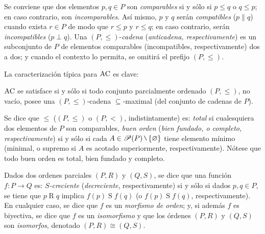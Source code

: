 Se conviene que dos elementos $p,q \in P$ son \textit{comparables} si y sólo si $p \leq q$ o $q \leq p$; en caso contrario, son \textit{incomparables}. Así mismo, $p$ y $q$ serán \textit{compatibles} ($p \parallel q$) cuando exista $r \in P$ de modo que $r \leq p$ y $r \leq q$; en caso contrario, serán \textit{incompatibles} ($p \perp q$). Una $(P,\leq)$-\textit{cadena} (\textit{anticadena, respectivamente}) es un subconjunto de $P$ de elementos comparables (incompatibles, respectivamente) dos a dos; y cuando el contexto lo permita, se omitirá el prefijo $(P,\leq)$.

La caracterización típica para $\operatorname{AC}$ es clave:

\begin{teorema}\label{teo-PMH}
	$\operatorname{AC}$ se satisface si y sólo si todo conjunto parcialmente ordenado $(P, \leq)$, no vacío, posee una $(P,\leq)$-cadena $\subseteq$-maximal (del conjunto de cadenas de $P$).
\end{teorema}

Se dice que $\leq$ ($(P,\leq)$ o $(P,<)$, indistintamente) es: \textit{total} si cualesquiera dos elementos de $P$ son comparables, \textit{buen orden} (\textit{bien fundado, o completo, respectivamente}) si y sólo si cada $A \in \ms{P}(P) \setminus \{\emptyset\}$ tiene elemento mínimo (minimal, o supremo si $A$ es acotado superiormente, respectivamente). Nótese que todo buen orden es total, bien fundado y completo.

Dados dos ordenes parciales $(P,R)$ y $(Q,S)$, se dice que una función $f:P \to Q$ es: \textit{$S$-creciente} (\textit{decreciente}, respectivamente) si y sólo si dados $p,q \in P$, se tiene que $p \mathrel{R} q$ implica $f(p) \mathrel{S} f(q)$ (o $f(p) \mathrel{S} f(q)$, respectivamente). En cualquier caso, se dice que $f$ es un \textit{morfismo de orden}; y, si además $f$ es biyectiva, se dice que $f$ es un \textit{isomorfismo} y que los órdenes $(P,R)$ y $(Q,S)$ son \textit{isomorfos}, denotado $(P,R) \cong (Q,S)$.

